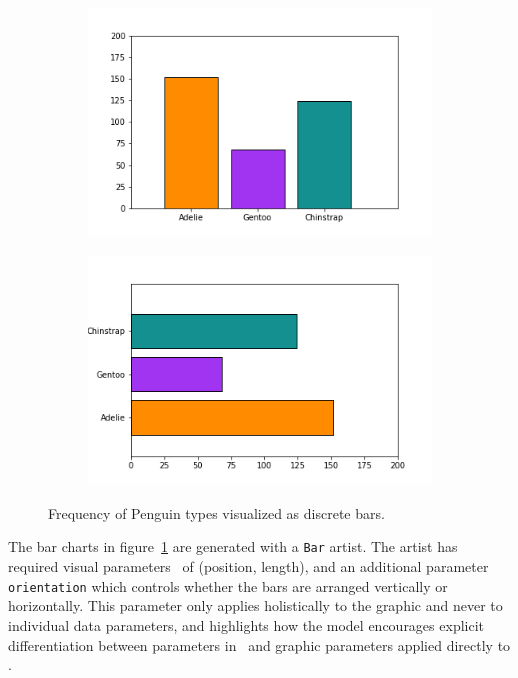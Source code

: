 \documentclass[../main.tex]{subfiles}
\begin{document}
 
\begin{figure}[H]
    \begin{subfigure}{0.5\textwidth}
        \includegraphics[width=\textwidth]{figures/code/bar_v.png}
    \end{subfigure}
    \begin{subfigure}{0.5\textwidth}
        \includegraphics[width=\textwidth]{figures/code/bar_h.png}
    \end{subfigure}
    \caption{Frequency of Penguin types visualized as discrete bars. }
    \label{fig:code_bar_simple}
\end{figure}
The bar charts in figure~\ref{fig:code_bar_simple} are generated with a \texttt{Bar} artist. The artist has required visual parameters \vfiber\ of (position, length), and an additional parameter \texttt{orientation} which controls whether the bars are arranged vertically or horizontally. This parameter only applies holistically to the graphic and never to individual data parameters, and highlights how the model encourages explicit differentiation between parameters in \vtotal\ and graphic parameters applied directly to \vmarkd. 
\end{document}
